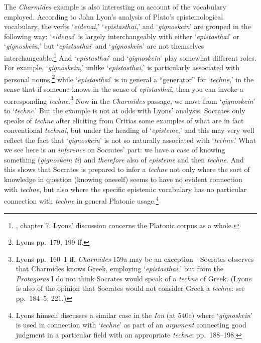 ﻿\documentclass[11pt]{amsart}
\begin{document}
The \emph{Charmides} example is also interesting on account of the vocabulary employed. According to John Lyon's analysis of Plato's epistemological vocabulary, the verbs `\emph{eidenai},' `\emph{epistasthai},' and `\emph{gignoskein}' are grouped in the following way: `\emph{eidenai}' is largely interchangeably with either `\emph{epistasthai}' or `\emph{gignoskein},' but `\emph{epistasthai}' and `\emph{gignoskein}' are not themselves interchangeable.\footnote{\citet{lyons1972ssa}, chapter 7. Lyons' discussion concerns the Platonic corpus as a whole.} And `\emph{epistasthai}' and `\emph{gignoskein}' play somewhat different roles. For example, `\emph{gignoskein},' unlike `\emph{epistasthai},' is particularly associated with personal nouns,\footnote{Lyons pp.~179, 199 ff.} while `\emph{epistasthai}' is in general a ``generator'' for `\emph{techne},' in the sense that if someone knows in the sense of \emph{epistasthai}, then you can invoke a corresponding \emph{techne}.\footnote{Lyons pp.~160--1 ff. \emph{Charmides} 159a may be an exception---Socrates observes that Charmides knows Greek, employing `\emph{epistasthai},' but from the \emph{Protagoras} I do not think Socrates would speak of a \emph{techne} of Greek. (Lyons is also of the opinion that Socrates would not consider Greek a \emph{techne}: see pp.~184--5, 221.)} Now in the \emph{Charmides} passage, we move from `\emph{gignoskein}' to `\emph{techne}.' But the example is not at odds with Lyons' analysis. Socrates only speaks of \emph{techne} after eliciting from Critias some examples of what are in fact conventional \emph{technai}, but under the heading of `\emph{episteme},' and this may very well reflect the fact that `\emph{gignoskein}' is not so naturally associated with `\emph{techne}.' What we see here is an \emph{inference} on Socrates' part: we have a case of knowing something (\emph{gignoskein ti}) and \emph{therefore} also of \emph{episteme} and then \emph{techne}. And this shows that Socrates is prepared to infer a \emph{techne} not only where the sort of knowledge in question (knowing oneself) seems to have no evident connection with \emph{techne}, but also where the specific epistemic vocabulary has no particular connection with \emph{techne} in general Platonic usage.\footnote{Lyons himself discusses a similar case in the \emph{Ion} (at 540e) where `\emph{gignoskein}' is used in connection with `\emph{techne}' as part of an \emph{argument} connecting good judgment in a particular field with an appropriate \emph{techne}: pp.~188--198.}%
\end{document}
